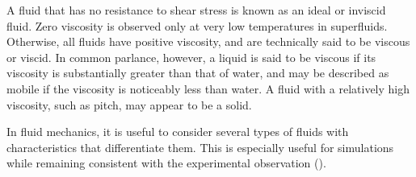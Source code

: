 	A fluid that has no resistance to shear stress is known as an ideal or inviscid fluid. Zero viscosity is observed only at very low temperatures in superfluids. Otherwise, all fluids have positive viscosity, and are technically said to be viscous or viscid. In common parlance, however, a liquid is said to be viscous if its viscosity is substantially greater than that of water, and may be described as mobile if the viscosity is noticeably less than water. A fluid with a relatively high viscosity, such as pitch, may appear to be a solid.
	
	In fluid mechanics, it is useful to consider several types of fluids with characteristics that differentiate them. This is especially useful for simulations while remaining consistent with the experimental observation ().
	

